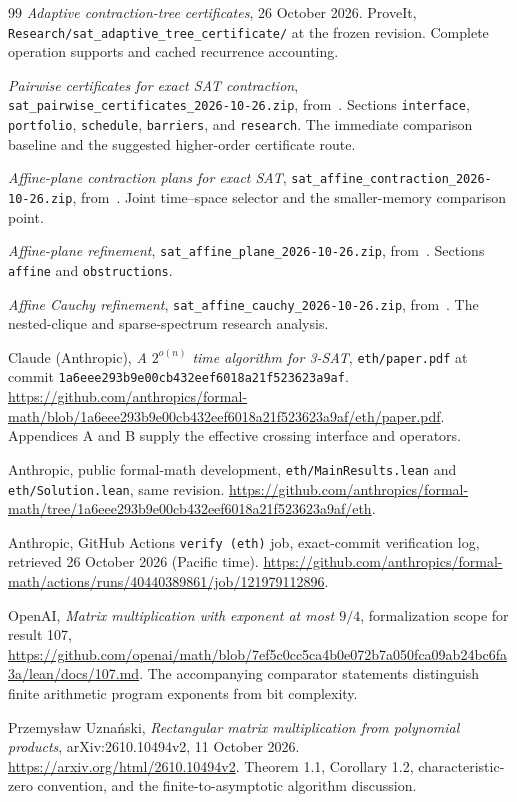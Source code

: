 \begin{thebibliography}{99}
\emph{Adaptive contraction-tree certificates}, 26 October 2026.
ProveIt, \texttt{Research/sat\_adaptive\_tree\_certificate/} at the frozen
revision. Complete operation supports and cached recurrence accounting.

\emph{Pairwise certificates for exact SAT contraction},
\nolinkurl{sat_pairwise_certificates_2026-10-26.zip}, from~\cite{arrival}.
Sections \texttt{interface}, \texttt{portfolio}, \texttt{schedule},
\texttt{barriers}, and \texttt{research}. The immediate comparison
baseline and the suggested higher-order certificate route.

\emph{Affine-plane contraction plans for exact SAT},
\texttt{sat\_affine\_contraction\_2026-10-26.zip}, from~\cite{arrival}.
Joint time--space selector and the smaller-memory comparison point.

\emph{Affine-plane refinement},
\texttt{sat\_affine\_plane\_2026-10-26.zip}, from~\cite{arrival}.
Sections \texttt{affine} and \texttt{obstructions}.

\emph{Affine Cauchy refinement},
\texttt{sat\_affine\_cauchy\_2026-10-26.zip}, from~\cite{arrival}.
The nested-clique and sparse-spectrum research analysis.

Claude (Anthropic), \emph{A $2^{o(n)}$ time algorithm for 3-SAT},
\texttt{eth/paper.pdf} at commit
\texttt{1a6eee293b9e00cb432eef6018a21f523623a9af}.
\url{https://github.com/anthropics/formal-math/blob/1a6eee293b9e00cb432eef6018a21f523623a9af/eth/paper.pdf}.
Appendices A and B supply the effective crossing interface and operators.

Anthropic, public formal-math development, \texttt{eth/MainResults.lean}
and \texttt{eth/Solution.lean}, same revision.
\url{https://github.com/anthropics/formal-math/tree/1a6eee293b9e00cb432eef6018a21f523623a9af/eth}.

Anthropic, GitHub Actions \texttt{verify (eth)} job, exact-commit
verification log, retrieved 26 October 2026 (Pacific time).
\url{https://github.com/anthropics/formal-math/actions/runs/40440389861/job/121979112896}.

OpenAI, \emph{Matrix multiplication with exponent at most $9/4$},
formalization scope for result 107,
\url{https://github.com/openai/math/blob/7ef5c0cc5ca4b0e072b7a050fca09ab24bc6fa3a/lean/docs/107.md}.
The accompanying comparator statements distinguish finite arithmetic
program exponents from bit complexity.

Przemys\l aw Uzna\'nski, \emph{Rectangular matrix multiplication from
polynomial products}, arXiv:2610.10494v2, 11 October 2026.
\url{https://arxiv.org/html/2610.10494v2}.
Theorem 1.1, Corollary 1.2, characteristic-zero convention, and the
finite-to-asymptotic algorithm discussion.

\end{thebibliography}
